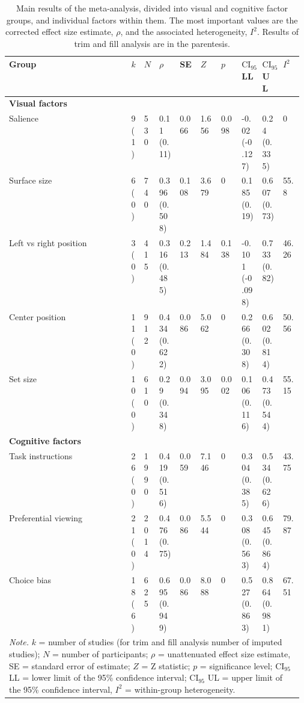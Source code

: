 \begin{table}[ht]
\centering
\caption{Main results of the meta-analysis, divided into visual and cognitive factor groups, and individual factors within them. The most important values are the corrected effect size estimate, $\rho$, and the associated heterogeneity, $I^2$. Results of trim and fill analysis are in the parentesis.} 
\label{tab:main_results}
\begingroup\small
\begin{tabular}{lp{0.03\linewidth}p{0.05\linewidth}p{0.07\linewidth}p{0.07\linewidth}p{0.07\linewidth}p{0.07\linewidth}p{0.07\linewidth}p{0.07\linewidth}p{0.07\linewidth}}
  \hline
Group & $k$ & $N$ & $\rho$ & SE & $Z$ & $p$ & $\textrm{CI}_{95}$ LL & $\textrm{CI}_{95}$ UL & $I^2$ \\ 
  \hline
\textbf{Visual factors} &  &  &  &  &  &  &  &  &  \\ 
  Salience & 9 (1) & 530 & 0.11 (0.11) & 0.066 & 1.656 & 0.098 & -0.02 (-0.127) & 0.24 (0.335) & 0 \\ 
  Surface size & 6 (0) & 740 & 0.396 (0.508) & 0.108 & 3.679 & 0 & 0.185 (0.19) & 0.607 (0.73) & 55.8 \\ 
  Left vs right position & 3 (0) & 415 & 0.316 (0.485) & 0.213 & 1.484 & 0.138 & -0.101 (-0.098) & 0.733 (0.82) & 46.26 \\ 
  Center position & 11 (0) & 912 & 0.434 (0.622) & 0.086 & 5.062 & 0 & 0.266 (0.308) & 0.602 (0.814) & 50.56 \\ 
  Set size & 10 (0) & 610 & 0.29 (0.348) & 0.094 & 3.095 & 0.002 & 0.106 (0.116) & 0.473 (0.544) & 55.15 \\ 
  \textbf{Cognitive factors} &  &  &  &  &  &  &  &  &  \\ 
  Task instructions & 26 (0) & 1990 & 0.419 (0.516) & 0.059 & 7.146 & 0 & 0.304 (0.385) & 0.534 (0.626) & 43.75 \\ 
  Preferential viewing & 21 (0) & 2014 & 0.476 (0.75) & 0.086 & 5.544 & 0 & 0.308 (0.563) & 0.645 (0.864) & 79.87 \\ 
  Choice bias & 18 (6) & 625 & 0.695 (0.949) & 0.086 & 8.088 & 0 & 0.527 (0.863) & 0.864 (0.981) & 67.51 \\ 
   \hline 
 \multicolumn{10}{p{0.9\textwidth}}{\scriptsize{\textit{Note.} $k$ = number of studies (for trim and fill analysis number of imputed studies); $N$ = number of participants; $\rho$ = unattenuated effect size estimate, SE = standard error of estimate; $Z$ = Z statistic; $p$ = significance level; $\textrm{CI}_{95}$ LL = lower limit of the 95\% confidence interval; $\textrm{CI}_{95}$ UL = upper limit of the 95\% confidence interval, $I^2$ = within-group heterogeneity.}} 
\end{tabular}
\endgroup
\end{table}
